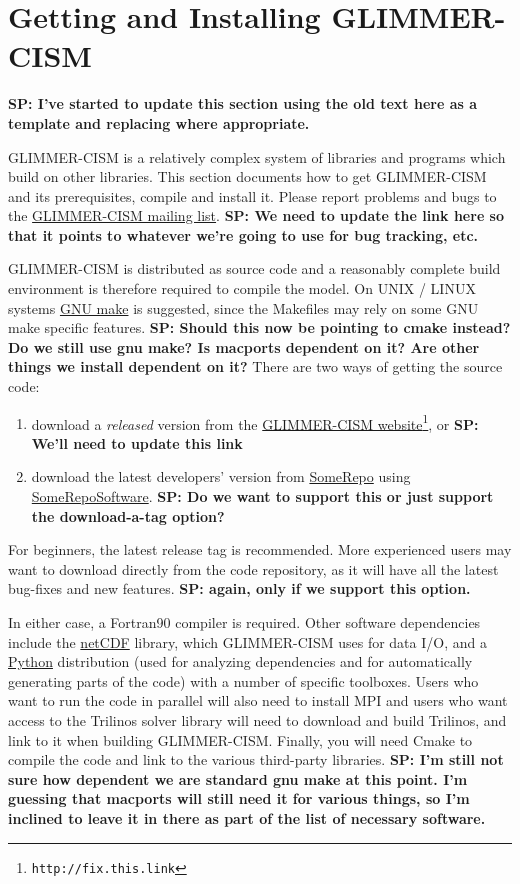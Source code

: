 
\section{Getting and Installing GLIMMER-CISM}

\textbf{SP: I've started to update this section using the old text here as a template and replacing where appropriate.}

GLIMMER-CISM is a relatively complex system of libraries and programs which build on other libraries. This section documents how to get GLIMMER-CISM and its prerequisites, compile and install it. Please report problems and bugs to the \href{http://link-here}{GLIMMER-CISM mailing list}. \textbf{SP: We need to update the link here so that it points to whatever we're going to use for bug tracking, etc.}

GLIMMER-CISM is distributed as source code and a reasonably complete build environment is therefore required to compile the model. On UNIX / LINUX systems \href{http://www.gnu.org/software/make/}{GNU make} is suggested, since the Makefiles may rely on some GNU make specific features. \textbf{SP: Should this now be pointing to cmake instead? Do we still use gnu make? Is macports dependent on it? Are other things we install dependent on it?} There are two ways of getting the source code:

\begin{enumerate}
\item download a {\it released} version from the \href{http://fix.this.link}{GLIMMER-CISM website}\footnote{\texttt{http://fix.this.link}}, or \textbf{SP: We'll need to update this link}
\item download the latest developers' version from \href{http://fix.this.link/}{SomeRepo} using \href{http://some.repo.software}{SomeRepoSoftware}. \textbf{SP: Do we want to support this or just support the download-a-tag option?}
\end{enumerate}

For beginners, the latest release tag is recommended. More experienced users may want to download directly from the code repository, as it will have all the latest bug-fixes and new features. \textbf{SP: again, only if we support this option.}

In either case, a Fortran90 compiler is required.  Other software dependencies include the \href{http://www.unidata.ucar.edu/packages/netcdf/index.html}{netCDF} library, which GLIMMER-CISM uses for data I/O, and a \href{http://www.python.org}{Python} distribution (used for analyzing dependencies and for automatically generating parts of the code) with a number of specific toolboxes. Users who want to run the code in parallel will also need to install MPI and users who want access to the Trilinos solver library will need to download and build Trilinos, and link to it when building GLIMMER-CISM. Finally, you will need Cmake to compile the code and link to the various third-party libraries. \textbf{SP: I'm still not sure how dependent we are standard gnu make at this point. I'm guessing that macports will still need it for various things, so I'm inclined to leave it in there as part of the list of necessary software.} 



